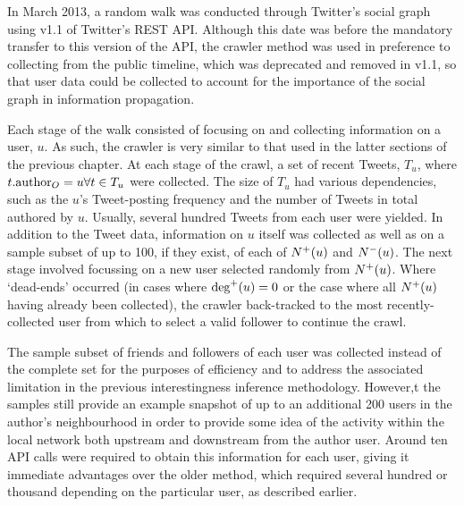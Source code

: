 In March 2013, a random walk was conducted through Twitter's social graph using v1.1 of Twitter's REST API. Although this date was before the mandatory transfer to this version of the API, the crawler method was used in preference to collecting from the public timeline, which was deprecated and removed in v1.1, so that user data could be collected to account for the importance of the social graph in information propagation.

Each stage of the walk consisted of focusing on and collecting information on a user, $u$. As such, the crawler is very similar to that used in the latter sections of the previous chapter. At each stage of the crawl, a set of recent Tweets, $T_u$, where $t.\textrm{author}_O = u \forall t \in T_u$ were collected. The size of $T_u$ had various dependencies, such as the $u$'s Tweet-posting frequency and the number of Tweets in total authored by $u$. Usually, several hundred Tweets from each user were yielded. In addition to the Tweet data, information on $u$ itself was collected as well as on a sample subset of up to 100, if they exist, of each of $N^+(u)$ and $N^-(u)$. The next stage involved focussing on a new user selected randomly from $N^+(u)$. Where `dead-ends' occurred (in cases where $\textrm{deg}^+(u) = 0$ or the case where all $N^+(u)$ having already been collected), the crawler back-tracked to the most recently-collected user from which to select a valid follower to continue the crawl.

The sample subset of friends and followers of each user was collected instead of the complete set for the purposes of efficiency and to address the associated limitation in the previous interestingness inference methodology. However,t the samples still provide an example snapshot of up to an additional 200 users in the author's neighbourhood in order to provide some idea of the activity within the local network both upstream and downstream from the author user. Around ten API calls were required to obtain this information for each user, giving it immediate advantages over the older method, which required several hundred or thousand depending on the particular user, as described earlier. 

